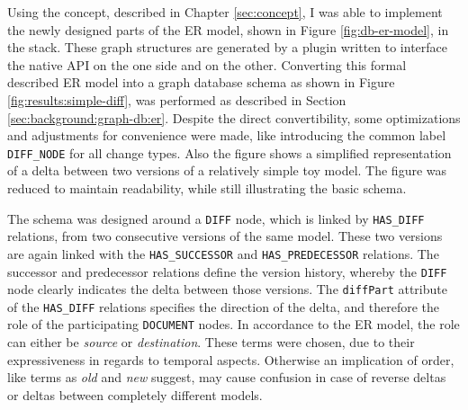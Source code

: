 
Using the concept, described in Chapter \ref{sec:concept}, I was able to implement the newly designed parts of the ER model, shown in Figure \ref{fig:db-er-model}, in the \masymos \neoj stack. These graph structures are generated by a plugin written to interface the native \neoj API on the one side and \bives on the other.
Converting this formal described ER model into a graph database schema as shown in Figure \ref{fig:results:simple-diff}, was performed as described in Section \ref{sec:background:graph-db:er}. Despite the direct convertibility, some optimizations and adjustments for convenience were made, like introducing the common label \texttt{DIFF\_NODE} for all change types.
Also the figure shows a simplified representation of a delta between two versions of a relatively simple toy model. The figure was reduced to maintain readability, while still illustrating the basic schema.

The schema was designed around a \texttt{DIFF} node, which is linked by \texttt{HAS\_DIFF} relations, from two consecutive versions of the same model. These two versions are again linked with the \texttt{HAS\_SUCCESSOR} and \texttt{HAS\_PREDECESSOR} relations.
The successor and predecessor relations define the version history, whereby the \texttt{DIFF} node clearly indicates the delta between those versions. The \texttt{diffPart} attribute of the \texttt{HAS\_DIFF} relations specifies the direction of the delta, and therefore the role of the participating \texttt{DOCUMENT} nodes. In accordance to the ER model, the role can either be \emph{source} or \emph{destination}.
These terms were chosen, due to their expressiveness in regards to temporal aspects. Otherwise an implication of order, like terms as \emph{old} and \emph{new} suggest, may cause confusion in case of reverse deltas or deltas between completely different models.

